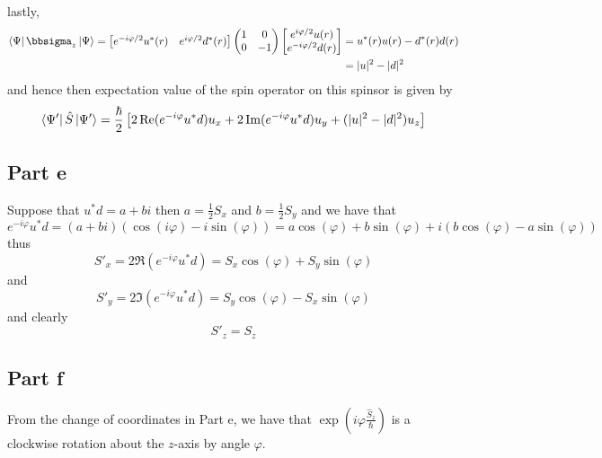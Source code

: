 \documentclass[12pt]{report}
\theoremstyle{custom}
\begin{document}
lastly,
\begin{align*}
  \bra{\Psi} \bbsigma_z \ket{\Psi} = \begin{bmatrix}e^{-i\varphi/2}u^*(r) &  e^{i\varphi/2}d^*(r)\end{bmatrix}\begin{pmatrix}1 & 0 \\ 0 & -1 \end{pmatrix} \begin{bmatrix} e^{i\varphi/2}u(r) \\ e^{-i\varphi/2}d(r) \end{bmatrix} &= u^*(r)u(r) - d^*(r)d(r) \\
                                                                     &= |u|^2 - |d|^2
\end{align*}
and hence then expectation value of the spin operator on this spinsor is given by
\begin{equation*}
  \bra{\Psi'} \hat{S} \ket{\Psi'} = \frac{\hbar}{2} \left[2\operatorname{\text{Re}}(e^{-i\varphi}u^*d) u_x + 2\operatorname{\text{Im}}(e^{-i\varphi}u^*d)u_y + (|u|^2 - |d|^2)u_z\right]
\end{equation*}

\subsection*{Part e}
Suppose that $u^*d = a + bi$ then $a = \frac{1}{2}S_x$ and $b = \frac{1}{2}S_y$ and we have that 
\begin{equation*}
  e^{-i\varphi} u^*d = (a + bi)(\cos(i\varphi) - i\sin(\varphi)) = a\cos(\varphi) + b\sin(\varphi) + i \left(b\cos(\varphi) - a\sin(\varphi)\right)
\end{equation*}
thus
\begin{equation*}
  S'_x = 2\Re(e^{-i\varphi}u^*d) = S_x \cos(\varphi) + S_y \sin(\varphi)
\end{equation*}
and
\begin{equation*}
  S'_y = 2\Im(e^{-i\varphi}u^*d) = S_y\cos(\varphi) - S_x\sin(\varphi)
\end{equation*}
and clearly
\begin{equation*}
  S'_z = S_z
\end{equation*}

\subsection*{Part f}
From the change of coordinates in Part e, we have that $ \exp\left(i \varphi \frac{\hat{S}_z}{\hbar}\right)$ is a clockwise rotation about the $z$-axis by angle $\varphi$.  
\end{document}
